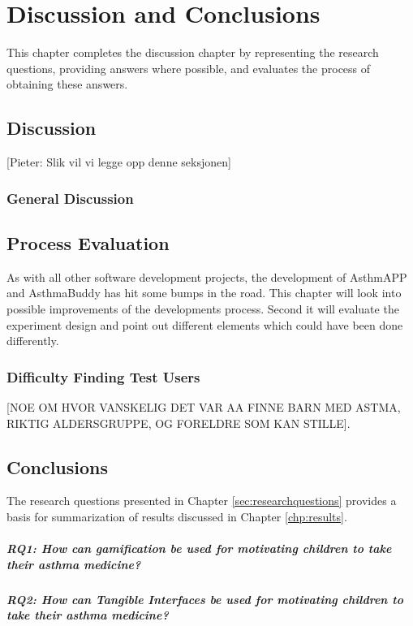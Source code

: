 \chapter{Discussion and Conclusions}
\label{chp:masterconclusion}

This chapter completes the discussion chapter by representing the research questions, providing answers where possible, and evaluates the process of obtaining these answers. 

\section{Discussion}
\label{sec:discussion}
[Pieter: Slik vil vi legge opp denne seksjonen]

\subsection{General Discussion}
\label{sec:generaldiscussion}



\section{Process Evaluation}
\label{sec:processevaluation}
As with all other software development projects, the development of AsthmAPP and AsthmaBuddy has hit some bumps in the road. This chapter will look into possible improvements of the developments process. Second it will evaluate the experiment design and point out different elements which could have been done differently.

\subsection{Difficulty Finding Test Users}
\label{sec:difficultyfindingtestusers}
[NOE OM HVOR VANSKELIG DET VAR AA FINNE BARN MED ASTMA, RIKTIG ALDERSGRUPPE, OG FORELDRE SOM KAN STILLE].

  
\section{Conclusions}
\label{conlusions}

The research questions presented in Chapter \ref{sec:researchquestions} provides a basis for summarization of results discussed in Chapter \ref{chp:results}. 

\paragraph{RQ1: How can gamification be used for motivating children to take their asthma medicine?}



\paragraph{RQ2: How can Tangible Interfaces be used for motivating children to take their asthma medicine?}





